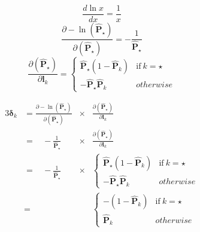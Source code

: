 \documentclass[xcolor={table}]{beamer}
\begin{document}
 \begin{frame} 
\begin{equation}
\frac{d \ln x}{d x} = \frac{1}{x}
\end{equation}
\begin{equation}
\frac{\partial - \ln \left(\mathbf{\hat{P}}_\star \right) }{\partial \left(\mathbf{\hat{P}}_\star \right)} = -\frac{1}{\mathbf{\hat{P}}_\star}
\label{eq:derivativeofneglogprob}
\end{equation}
\begin{equation}
\frac{\partial \left(\mathbf{\hat{P}}_\star \right)}{\partial \mathbf{l}_k} = 	\begin{cases}
		 \mathbf{\hat{P}}_\star  \left(1-\mathbf{\hat{P}}_k \right) & \text{if}~k = \star \\
		- \mathbf{\hat{P}}_\star  \mathbf{\hat{P}}_k & otherwise
		\end{cases}
\label{eq:softmaxderivative}
\end{equation}
\end{frame} 



 \begin{frame} 
\begin{alignat}{3}
\boldsymbol{\delta}_k&= \frac{\partial - \ln \left(\mathbf{\hat{P}}_\star \right) }{\partial \left(\mathbf{\hat{P}}_\star \right)} & \times & \frac{\partial \left(\mathbf{\hat{P}}_\star \right)}{\partial \mathbf{l}_k} \label{eq:chainCEdefStep5}\\
~ &= ~~~~-\frac{1}{\mathbf{\hat{P}}_\star} & \times & \frac{\partial \left(\mathbf{\hat{P}}_\star \right)}{\partial \mathbf{l}_k} \label{eq:chainCEdefStep6}\\
~ &= ~~~~-\frac{1}{\mathbf{\hat{P}}_\star} & \times & \begin{cases}
		 \mathbf{\hat{P}}_\star  \left(1-\mathbf{\hat{P}}_k \right) & \text{if}~k = \star \\
		- \mathbf{\hat{P}}_\star  \mathbf{\hat{P}}_k & otherwise
		\end{cases} \label{eq:chainCEdefStep7}\\
~ &= && \begin{cases}
		 - \left(1-\mathbf{\hat{P}}_k \right) & \text{if}~k = \star \\
		\mathbf{\hat{P}}_k & otherwise
		\end{cases}  \label{eq:chainCEdefStep8}
\end{alignat}
\end{frame} 
\end{document}
